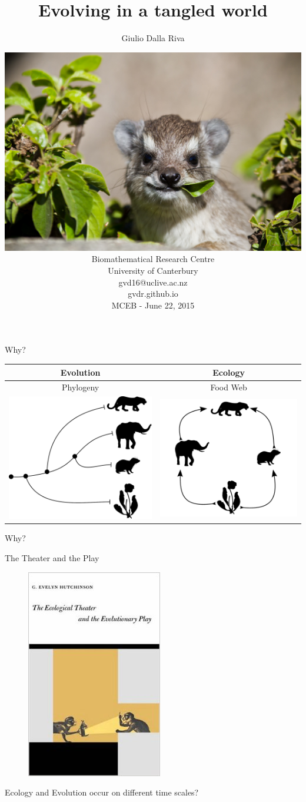 \documentclass[]{beamer}
\title{Evolving in a tangled world}
\author{Giulio Dalla Riva}
\date{ \includegraphics[width=0.4\linewidth]{images/hyraxchew.jpg}\\
  {\tiny Biomathematical Research Centre\\
  University of Canterbury\\
  gvd16@uclive.ac.nz\\
  gvdr.github.io\\}
MCEB - June 22, 2015}
\begin{document}
\frame{\titlepage
\addtocounter{framenumber}{-1}}

\begin{frame}{Why?}

\centering
\begin{tabular}{|c|c|}\hline
Evolution & Ecology \\\hline\hline
Phylogeny & Food Web \\
\includegraphics[width=0.4 \textwidth]{images/small_phylo.pdf} & \includegraphics[width=0.4 \textwidth]{images/small_fw.pdf} \\ \hline
\end{tabular}

\end{frame}

\begin{frame}{Why?}

\centering
The Theater and the Play

\begin{figure}
\centering
\includegraphics[height=0.5 \textheight]{images/hutchinson_ecotheatreevoplay.jpg}
\end{figure}
\centering
{\tiny Ecology and Evolution occur on different time scales?}

\end{frame}
\end{document}

